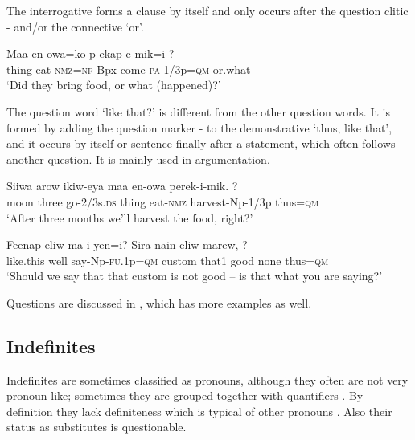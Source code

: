 The interrogative  forms a clause by itself and only occurs after the question clitic - and/or the connective  `or'. 

\ea%
\label{ex:x529}
\gll Maa en-owa=ko p-ekap-e-mik=i ? \\
thing eat-\textsc{nmz}=\textsc{nf} Bpx-come-\textsc{pa}-1/3p=\textsc{qm} or.what\\
\glt`Did they bring food, or what (happened)?'
\z

The question word  `like that?' is different from the other question words. It is formed by adding the question marker - to the demonstrative  `thus, like that', and it occurs by itself or sentence-finally after a statement, which often follows another question. It is mainly used in argumentation. 

\ea%
\label{ex:x1194}
\gll Siiwa arow ikiw-eya maa en-owa perek-i-mik. ? \\
moon three go-2/3s.\textsc{ds} thing eat-\textsc{nmz} harvest-Np-1/3p thus=\textsc{qm}\\
\glt`After three months we'll harvest the food, right?'
\z

\ea%
\label{ex:x1195}
\gll Feenap eliw ma-i-yen=i? Sira nain eliw marew, ?\\
like.this well say-Np-\textsc{fu}.1p=\textsc{qm} custom that1 good none thus=\textsc{qm}\\
\glt`Should we say that that custom is not good -- is that what you are saying?'
\z

Questions are discussed in , which has more examples as well.

\subsection{Indefinites}
{}
Indefinites are sometimes classified as pronouns, although they often are not very pronoun-like; sometimes they are grouped together with quantifiers \citep[81]{HakulinenEtAl1979}%
. By definition they lack definiteness which is typical of other pronouns \citep[376]{QuirkEtAl1985}. Also their status as  substitutes is questionable.

